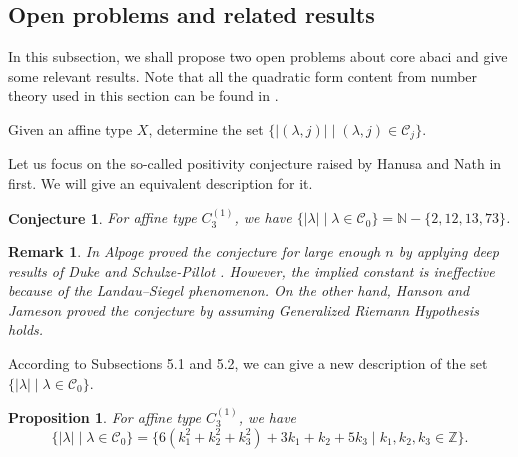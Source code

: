\documentclass[11pt]{amsart}
\theoremstyle{plain}
\numberwithin{equation}{subsection}
\newtheorem{proposition}[theorem]{Proposition}
\newtheorem{conjecture}[theorem]{Conjecture}
\newtheorem{remark}[theorem]{Remark}
\newcommand{\lam}{\lambda}
\begin{document}



\subsection{Open problems and related results} In this subsection, we shall propose two open problems about core abaci and give some relevant results.
Note that all the quadratic form content from number theory used in this section can be found in \cite{G, I}.

\smallskip

 Given an affine type $X$, determine the set $\{|(\lam, j)|\mid (\lam, j)\in \mathcal{C}_j\}$.

\smallskip

Let us focus on the so-called positivity conjecture raised by Hanusa and Nath in \cite{HN} first. 
We will give an equivalent description for it.
\begin{conjecture}\label{6.7}
For affine type $C_3^{(1)}$, we have
$\{|\lam|\mid \lam\in \mathcal{C}_0\}=\mathbb{N}-\{2, 12, 13, 73\}$.
\end{conjecture}

\begin{remark}{\rm
In \cite{A} Alpoge proved the conjecture for large enough $n$ by applying deep results of Duke and Schulze-Pillot \cite{DS}.
However, the implied constant is ineffective because of the Landau–Siegel phenomenon. On the other hand, 
Hanson and Jameson \cite{HJ} proved the conjecture by assuming Generalized Riemann Hypothesis holds.}
\end{remark}

According to Subsections 5.1 and 5.2, we can give a new description of the set $\{|\lam|\mid \lam\in \mathcal{C}_0\}$.

\begin{proposition}\label{6.10}
For affine type $C_3^{(1)}$, we have
$$\{|\lam|\mid \lam\in \mathcal{C}_0\}= \{6(k_1^2+k_2^2+k_3^2)+3k_1+k_2+5k_3\mid k_1, k_2, k_3\in \mathbb{Z}\}.$$
\end{proposition}
\end{document}
